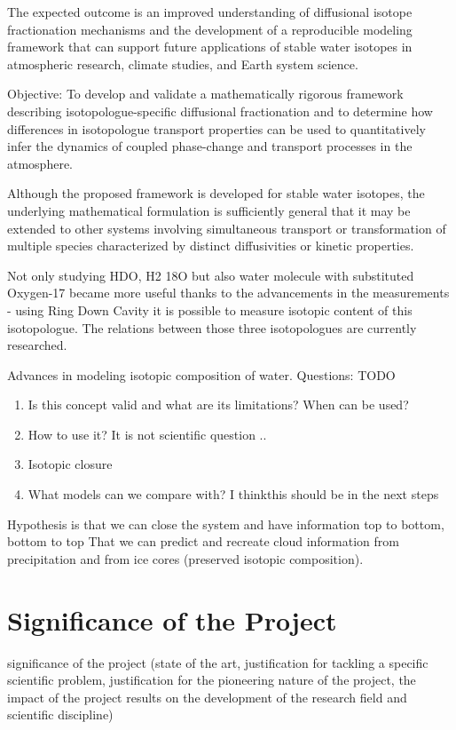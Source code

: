 \documentclass[11pt,a4paper]{article}
\begin{document}
The expected outcome is an improved understanding of diffusional isotope fractionation mechanisms
and the development of a reproducible modeling framework that can support future applications of
stable water isotopes in atmospheric research, climate studies, and Earth system science.

Objective:
To develop and validate a mathematically rigorous framework describing isotopologue-specific diffusional
fractionation and to determine how differences in isotopologue transport properties can be used to quantitatively
infer the dynamics of coupled phase-change and transport processes in the atmosphere.

Although the proposed framework is developed for stable water isotopes, the underlying mathematical
formulation is sufficiently general that it may be extended to other systems involving simultaneous
transport or transformation of multiple species characterized by distinct diffusivities or kinetic properties.

Not only studying HDO, H2 18O but also water molecule with substituted Oxygen-17 became more useful thanks to the
advancements in the measurements - using Ring Down Cavity it is possible to measure isotopic content of this isotopologue.
The relations between those three isotopologues are currently researched. 



Advances in modeling isotopic composition of water.
Questions: {\color{red}TODO}
\begin{enumerate}
    \item Is this concept valid and what are its limitations? When can be used?
    \item How to use it? It is not scientific question .. 
    \item Isotopic closure
    \item What models can we compare with? I thinkthis should be in the next steps
\end{enumerate}

Hypothesis is that we can close the system and have information top to bottom, bottom to top
That we can predict and recreate cloud information from precipitation and from ice cores
(preserved isotopic composition).


\section{Significance of the Project}
significance of the project (state of the art, justification for tackling a specific scientific problem,
justification for the pioneering nature of the project,
the impact of the project results on the development of the research field and scientific discipline)
\end{document}
